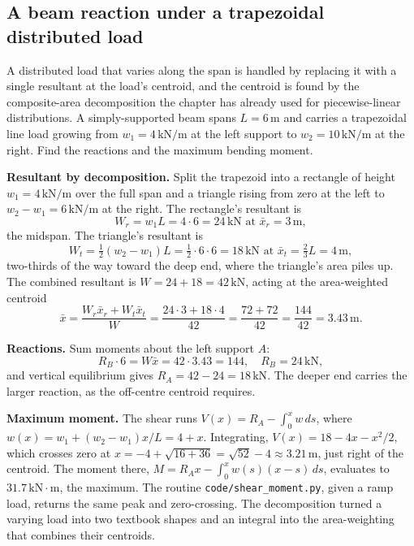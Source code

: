 \subsection{A beam reaction under a trapezoidal distributed load}

A distributed load that varies along the span is handled by replacing it
with a single resultant at the load's centroid, and the centroid is found
by the composite-area decomposition the chapter has already used for
piecewise-linear distributions. A
simply-supported beam spans $L = 6\,\si{\meter}$ and carries a
trapezoidal line load growing from $w_1 = 4\,\text{kN}/\text{m}$ at the
left support to $w_2 = 10\,\text{kN}/\text{m}$ at the right. Find the
reactions and the maximum bending moment.

\textbf{Resultant by decomposition.} Split the trapezoid into a rectangle
of height $w_1 = 4\,\text{kN}/\text{m}$ over the full span and a triangle
rising from zero at the left to $w_2 - w_1 = 6\,\text{kN}/\text{m}$ at the
right. The rectangle's resultant is
\[
W_r = w_1 L = 4 \cdot 6 = 24\,\text{kN} \text{ at } \bar{x}_r = 3\,\si{\meter},
\]
the midspan. The triangle's resultant is
\[
W_t = \tfrac{1}{2}(w_2 - w_1) L = \tfrac{1}{2}\cdot 6 \cdot 6 = 18\,\text{kN}
\text{ at } \bar{x}_t = \tfrac{2}{3} L = 4\,\si{\meter},
\]
two-thirds of the way toward the deep end, where the triangle's area
piles up. The combined resultant is $W = 24 + 18 = 42\,\text{kN}$, acting
at the area-weighted centroid
\[
\bar{x} = \frac{W_r \bar{x}_r + W_t \bar{x}_t}{W}
= \frac{24 \cdot 3 + 18 \cdot 4}{42}
= \frac{72 + 72}{42} = \frac{144}{42} = 3.43\,\si{\meter}.
\]

\textbf{Reactions.} Sum moments about the left support $A$:
\[
R_B \cdot 6 = W \bar{x} = 42 \cdot 3.43 = 144, \quad R_B = 24\,\text{kN},
\]
and vertical equilibrium gives $R_A = 42 - 24 = 18\,\text{kN}$. The
deeper end carries the larger reaction, as the off-centre centroid
requires.

\textbf{Maximum moment.} The shear runs $V(x) = R_A - \int_0^x w\,ds$,
where $w(x) = w_1 + (w_2 - w_1)x/L = 4 + x$. Integrating,
$V(x) = 18 - 4x - x^2/2$, which crosses zero at
$x = -4 + \sqrt{16 + 36} = \sqrt{52} - 4 \approx 3.21\,\si{\meter}$, just
right of the centroid. The moment there, $M = R_A x - \int_0^x
w(s)(x - s)\,ds$, evaluates to $31.7\,\text{kN}\cdot\text{m}$, the maximum.
The routine \texttt{code/shear\_moment.py}, given a ramp load, returns the
same peak and zero-crossing. The decomposition turned a varying load into
two textbook shapes and an integral into the area-weighting that combines
their centroids.

